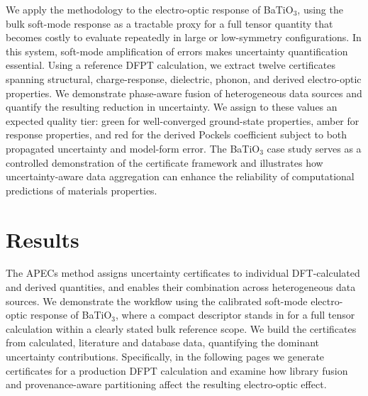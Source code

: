 \documentclass[twocolumn,superscriptaddress,amsmath,amssymb,longbibliography]{revtex4-2}
\begin{document}
We apply the methodology to the electro-optic response of BaTiO$_3$, using the
bulk soft-mode response as a tractable proxy for a full tensor quantity that
becomes costly to evaluate repeatedly in large or low-symmetry configurations.
In this system, soft-mode amplification of errors makes uncertainty
quantification essential. Using a reference DFPT calculation, we extract twelve
 certificates spanning structural, charge-response, dielectric,
phonon, and derived electro-optic properties.
We demonstrate phase-aware fusion of heterogeneous data sources and quantify the resulting reduction in uncertainty.
We assign to these values an expected quality tier: green for well-converged ground-state properties, amber for
response properties, and red for the derived Pockels coefficient subject
to both propagated uncertainty and model-form error. The BaTiO$_3$ case study serves as a controlled demonstration of the certificate framework and illustrates how uncertainty-aware data aggregation can enhance the reliability of computational predictions of materials properties.


\section{Results}
\label{sec:results}



The APECs method assigns uncertainty certificates to individual DFT-calculated and derived quantities, and enables their combination across heterogeneous data sources. We demonstrate the workflow using the calibrated soft-mode electro-optic response of BaTiO$_3$, where a compact descriptor stands in for a full tensor calculation within a clearly stated bulk reference scope. We build the certificates from calculated, literature and database data, quantifying the dominant uncertainty contributions. Specifically, in the following pages we generate certificates for a production DFPT calculation and examine how library fusion and provenance-aware partitioning affect the resulting electro-optic effect.
\end{document}

